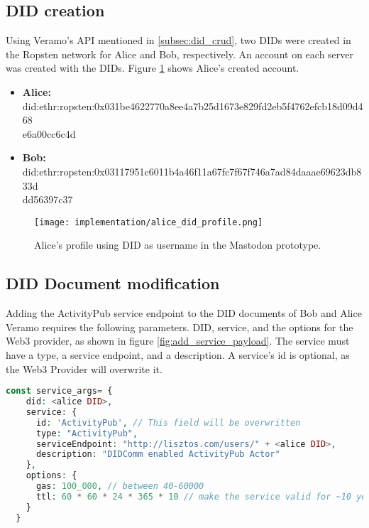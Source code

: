 \subsection*{DID creation}
Using Veramo's API mentioned in \autoref{subsec:did_crud}, two DIDs were created in the Ropsten network for Alice and Bob, respectively. An account on each server was created with the DIDs. Figure \ref{fig:alice_profile} shows Alice's created account. 

\begin{itemize}
  \item \textbf{Alice:} 
  did:ethr:ropsten:0x031be4622770a8ee4a7b25d1673e829fd2eb5f4762efcb18d09d468\\e6a00cc6c4d
  \item \textbf{Bob:} 
did:ethr:ropsten:0x03117951c6011b4a46f11a67fc7f67f746a7ad84daaae69623db833d\\dd56397c37
\end{itemize}

\begin{figure}[H]
  \centering
  \texttt{[image: implementation/alice\_did\_profile.png]}
  \caption{Alice's profile using DID as username in the Mastodon prototype.}
  \label{fig:alice_profile}
\end{figure}

\subsection*{DID Document modification}
Adding the ActivityPub service endpoint to the DID documents of Bob and Alice Veramo requires the following parameters. DID, service, and the options for the Web3 provider, as shown in figure \ref{fig:add_service_payload}. The service must have a type, a service endpoint, and a description. A service's id is optional, as the Web3 Provider will overwrite it. 

\lstset{style=JSONStyle}
\begin{lstlisting}[language=PHP, caption=Parameters to add a service in Veramo, label=fig:add_service_payload, float=h]
  const service_args= {
    did: <alice DID>,
    service: {
      id: 'ActivityPub', // This field will be overwritten
      type: "ActivityPub",
      serviceEndpoint: "http://lisztos.com/users/" + <alice DID>,
      description: "DIDComm enabled ActivityPub Actor"
    },
    options: {
      gas: 100_000, // between 40-60000
      ttl: 60 * 60 * 24 * 365 * 10 // make the service valid for ~10 years
    }
  }
\end{lstlisting}

